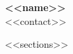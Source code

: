 \documentclass[11pt,letterpaper]{article}
\begin{document}
\begin{center}
    {\Large \textbf{<<name>>}} \\
    \vspace{0.2em}
    <<contact>>
\end{center}

\vspace{0.5em}

<<sections>>
\end{document}
